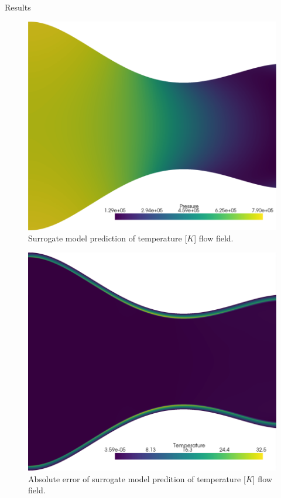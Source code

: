 \begin{frame}{Results}
\begin{figure}
\hypertarget{fig:prediction_temperature}{%
\centering
\includegraphics{figures/Pressure_field_reconstructed.png}
\caption{Surrogate model prediction of temperature {[}\(K\){]} flow
field.}\label{fig:prediction_temperature}
}
\end{figure}

\begin{figure}
\hypertarget{fig:error_temperature}{%
\centering
\includegraphics{figures/Temperature_field_error.png}
\caption{Absolute error of surrogate model predition of temperature
{[}\(K\){]} flow field.}\label{fig:error_temperature}
}
\end{figure}


\end{frame}
